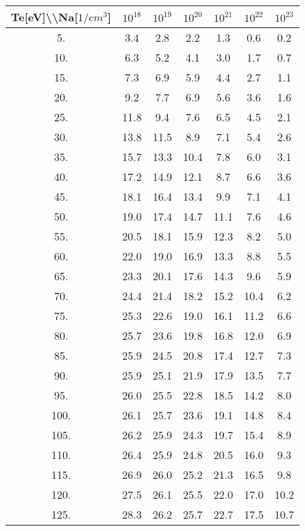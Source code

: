 \begin{tabular}{|c||c|c|c|c|c|c|}
\hline
Te[eV]\textbackslash \textbackslash Na[$1/cm^3$] & $10^{18}$ & $10^{19}$ & $10^{20}$ & $10^{21}$ & $10^{22}$ & $10^{23}$\tabularnewline
\hline
\hline
   5. &     3.4 &     2.8 &     2.2 &     1.3 &     0.6 &     0.2\tabularnewline
\hline
  10. &     6.3 &     5.2 &     4.1 &     3.0 &     1.7 &     0.7\tabularnewline
\hline
  15. &     7.3 &     6.9 &     5.9 &     4.4 &     2.7 &     1.1\tabularnewline
\hline
  20. &     9.2 &     7.7 &     6.9 &     5.6 &     3.6 &     1.6\tabularnewline
\hline
  25. &    11.8 &     9.4 &     7.6 &     6.5 &     4.5 &     2.1\tabularnewline
\hline
  30. &    13.8 &    11.5 &     8.9 &     7.1 &     5.4 &     2.6\tabularnewline
\hline
  35. &    15.7 &    13.3 &    10.4 &     7.8 &     6.0 &     3.1\tabularnewline
\hline
  40. &    17.2 &    14.9 &    12.1 &     8.7 &     6.6 &     3.6\tabularnewline
\hline
  45. &    18.1 &    16.4 &    13.4 &     9.9 &     7.1 &     4.1\tabularnewline
\hline
  50. &    19.0 &    17.4 &    14.7 &    11.1 &     7.6 &     4.6\tabularnewline
\hline
  55. &    20.5 &    18.1 &    15.9 &    12.3 &     8.2 &     5.0\tabularnewline
\hline
  60. &    22.0 &    19.0 &    16.9 &    13.3 &     8.8 &     5.5\tabularnewline
\hline
  65. &    23.3 &    20.1 &    17.6 &    14.3 &     9.6 &     5.9\tabularnewline
\hline
  70. &    24.4 &    21.4 &    18.2 &    15.2 &    10.4 &     6.2\tabularnewline
\hline
  75. &    25.3 &    22.6 &    19.0 &    16.1 &    11.2 &     6.6\tabularnewline
\hline
  80. &    25.7 &    23.6 &    19.8 &    16.8 &    12.0 &     6.9\tabularnewline
\hline
  85. &    25.9 &    24.5 &    20.8 &    17.4 &    12.7 &     7.3\tabularnewline
\hline
  90. &    25.9 &    25.1 &    21.9 &    17.9 &    13.5 &     7.7\tabularnewline
\hline
  95. &    26.0 &    25.5 &    22.8 &    18.5 &    14.2 &     8.0\tabularnewline
\hline
 100. &    26.1 &    25.7 &    23.6 &    19.1 &    14.8 &     8.4\tabularnewline
\hline
 105. &    26.2 &    25.9 &    24.3 &    19.7 &    15.4 &     8.9\tabularnewline
\hline
 110. &    26.4 &    25.9 &    24.8 &    20.5 &    16.0 &     9.3\tabularnewline
\hline
 115. &    26.9 &    26.0 &    25.2 &    21.3 &    16.5 &     9.8\tabularnewline
\hline
 120. &    27.5 &    26.1 &    25.5 &    22.0 &    17.0 &    10.2\tabularnewline
\hline
 125. &    28.3 &    26.2 &    25.7 &    22.7 &    17.5 &    10.7\tabularnewline
\hline
\end{tabular}
